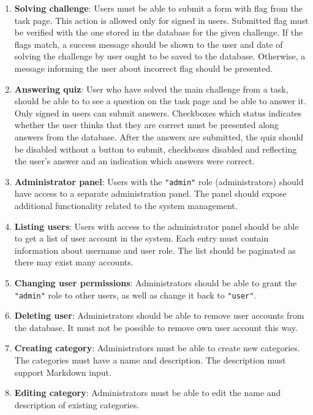 \begin{enumerate}
	\item \textbf{Solving challenge}: Users must be able to submit a form with flag from the task page. This action is allowed only for signed in users. Submitted flag must be verified with the one stored in the database for the given challenge. If the flags match, a success message should be shown to the user and date of solving the challenge by user ought to be saved to the database. Otherwise, a message informing the user about incorrect flag should be presented.

	\item \textbf{Answering quiz}: User who have solved the main challenge from a task, should be able to to see a question on the task page and be able to answer it. Only signed in users can submit answers. Checkboxes which status indicates whether the user thinks that they are correct must be presented along answers from the database. After the answers are submitted, the quiz should be disabled without a button to submit, checkboxes disabled and reflecting the user's answer and an indication which answers were correct.

	\item \textbf{Administrator panel}: Users with the \texttt{"admin"} role (administrators) should have access to a separate administration panel. The panel should expose additional functionality related to the system management.

	\item \textbf{Listing users}: Users with access to the administrator panel should be able to get a list of user account in the system. Each entry must contain information about username and user role. The list should be paginated as there may exist many accounts.

	\item \textbf{Changing user permissions}: Administrators should be able to grant the \texttt{"admin"} role to other users, as well as change it back to \texttt{"user"}.

	\item \textbf{Deleting user}: Administrators should be able to remove user accounts from the database. It must not be possible to remove own user account this way.

	\item \textbf{Creating category}: Administrators must be able to create new categories. The categories must have a name and description. The description must support Markdown input.

	\item \textbf{Editing category}: Administrators must be able to edit the name and description of existing categories.


\end{enumerate}

